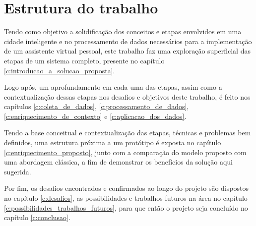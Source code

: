 \section{Estrutura do trabalho} \label{s:estrutura_do_trabalho}

Tendo como objetivo a solidificação dos conceitos e etapas envolvidos em uma cidade inteligente e no processamento de dados necessários para a implementação de um assistente virtual pessoal, este trabalho faz uma exploração superficial das etapas de um sistema completo, presente no capítulo \ref{c:introducao_a_solucao_proposta}.

Logo após, um aprofundamento em cada uma das etapas, assim como a contextualização dessas etapas nos desafios e objetivos deste trabalho, é feito nos capítulos \ref{c:coleta_de_dados}, \ref{c:processamento_de_dados}, \ref{c:enriquecimento_de_contexto} e \ref{c:aplicacao_dos_dados}.

Tendo a base conceitual e contextualização das etapas, técnicas e problemas bem definidos, uma estrutura próxima a um protótipo é exposta no capítulo \ref{c:enriquecimento_proposto}, junto com a comparação do modelo proposto com uma abordagem clássica, a fim de demonstrar os benefícios da solução aqui sugerida.

Por fim, os desafios encontrados e confirmados ao longo do projeto são dispostos no capítulo \ref{c:desafios}, as possibilidades e trabalhos futuros na área no capítulo \ref{c:possibilidades_trabalhos_futuros}, para que então o projeto seja concluído no capítulo \ref{c:conclusao}.

